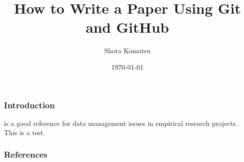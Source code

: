 \documentclass{beamer}
\title{How to Write a Paper Using Git and GitHub}
\author{Shota Komatsu}
\date{\today}
\begin{document}
\frame{\titlepage}

\begin{frame}
\frametitle{Introduction}
\citet{knittel2018working} is a good reference for data management issues in empirical research projects.
This is a test.
\end{frame}

\begin{frame}
\frametitle{References}


    

\end{frame}
\end{document}
